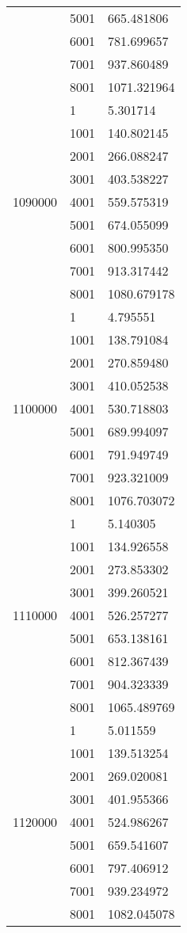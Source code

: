 \begin{table}[htb!]
\begin{tabular}{lll}
 & 5001 & 665.481806 \\
 & 6001 & 781.699657 \\
 & 7001 & 937.860489 \\
 & 8001 & 1071.321964 \\
\multirow[c]{9}{*}{1090000} & 1 & 5.301714 \\
 & 1001 & 140.802145 \\
 & 2001 & 266.088247 \\
 & 3001 & 403.538227 \\
 & 4001 & 559.575319 \\
 & 5001 & 674.055099 \\
 & 6001 & 800.995350 \\
 & 7001 & 913.317442 \\
 & 8001 & 1080.679178 \\
\multirow[c]{9}{*}{1100000} & 1 & 4.795551 \\
 & 1001 & 138.791084 \\
 & 2001 & 270.859480 \\
 & 3001 & 410.052538 \\
 & 4001 & 530.718803 \\
 & 5001 & 689.994097 \\
 & 6001 & 791.949749 \\
 & 7001 & 923.321009 \\
 & 8001 & 1076.703072 \\
\multirow[c]{9}{*}{1110000} & 1 & 5.140305 \\
 & 1001 & 134.926558 \\
 & 2001 & 273.853302 \\
 & 3001 & 399.260521 \\
 & 4001 & 526.257277 \\
 & 5001 & 653.138161 \\
 & 6001 & 812.367439 \\
 & 7001 & 904.323339 \\
 & 8001 & 1065.489769 \\
\multirow[c]{9}{*}{1120000} & 1 & 5.011559 \\
 & 1001 & 139.513254 \\
 & 2001 & 269.020081 \\
 & 3001 & 401.955366 \\
 & 4001 & 524.986267 \\
 & 5001 & 659.541607 \\
 & 6001 & 797.406912 \\
 & 7001 & 939.234972 \\
 & 8001 & 1082.045078 \\

\end{tabular}
\end{table}
